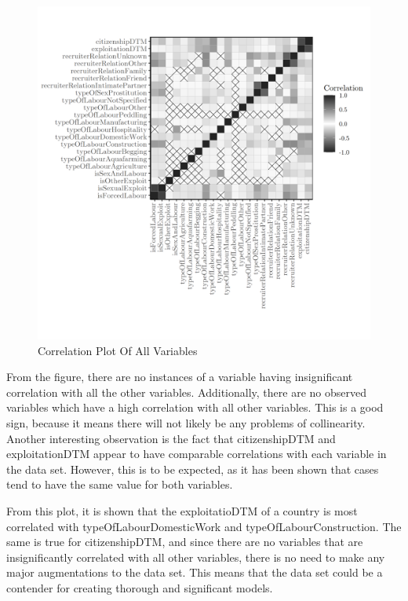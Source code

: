 \documentclass{article} %
\begin{document}
\FloatBarrier
\begin{figure}[H]
	\includegraphics[width = \textwidth]{CorrPlot2}
	\caption{Correlation Plot Of All Variables}
	\label{fig:CorPlot}
\end{figure}
\FloatBarrier

From the figure, there are no instances of a variable having insignificant correlation with all the other variables. Additionally, there are no observed variables which have a high correlation with all other variables. This is a good sign, because it means there will not likely be any problems of collinearity. Another interesting observation is the fact that citizenshipDTM and exploitationDTM appear to have comparable correlations with each variable in the data set. However, this is to be expected, as it has been shown that cases tend to have the same value for both variables. 

From this plot, it is shown that the exploitatioDTM of a country is most correlated with typeOfLabourDomesticWork and typeOfLabourConstruction. The same is true for citizenshipDTM, and since there are no variables that are insignificantly correlated with all other variables, there is no need to make any major augmentations to the data set. This means that the data set could be a contender for creating thorough and significant models.
\end{document}
